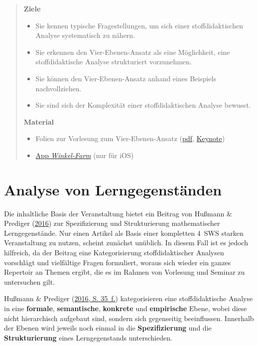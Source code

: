 \documentclass[
]{scrbook}
\providecommand{\tightlist}{%
  \setlength{\itemsep}{0pt}\setlength{\parskip}{0pt}}
\theoremstyle{definition}
\theoremstyle{definition}
\theoremstyle{definition}
\theoremstyle{definition}
\theoremstyle{remark}
\begin{document}
\begin{quote}
\textbf{Ziele}

\begin{itemize}
\tightlist
\item
  Sie kennen typische Fragestellungen, um sich einer stoffdidaktischen Analyse systematisch zu nähern.
\item
  Sie erkennen den Vier-Ebenen-Ansatz als eine Möglichkeit, eine stoffdidaktische Analyse strukturiert vorzunehmen.
\item
  Sie können den Vier-Ebenen-Ansatz anhand eines Beispiels nachvollziehen.
\item
  Sie sind sich der Komplexität einer stoffdidaktischen Analyse bewusst.
\end{itemize}

\textbf{Material}

\begin{itemize}
\tightlist
\item
  Folien zur Vorlesung zum Vier-Ebenen-Ansatz (\href{files/Stoffdidaktik-WiSe2223-Kap1.pdf}{pdf}, \href{files/Stoffdidaktik-WiSe2223-Kap1.key}{Keynote})
\item
  \href{https://apps.apple.com/de/app/winkel-farm/id1369585218}{App \emph{Winkel-Farm}} (nur für iOS)
\end{itemize}
\end{quote}

\hypertarget{analyse-von-lerngegenstuxe4nden}{%
\section{Analyse von Lerngegenständen}\label{analyse-von-lerngegenstuxe4nden}}

Die inhaltliche Basis der Veranstaltung bietet ein Beitrag von Hußmann \& Prediger (\protect\hyperlink{ref-Hussmann:2016}{2016}) zur Spezifizierung und Strukturierung mathematischer Lerngegenstände. Nur einen Artikel als Basis einer kompletten 4~SWS starken Veranstaltung zu nutzen, scheint zunächst unüblich. In diesem Fall ist es jedoch hilfreich, da der Beitrag eine Kategorisierung stoffdidaktischer Analysen vorschlägt und vielfältige Fragen formuliert, woraus sich wieder ein ganzes Repertoir an Themen ergibt, die es im Rahmen von Vorlesung und Seminar zu untersuchen gilt.

Hußmann \& Prediger (\protect\hyperlink{ref-Hussmann:2016}{2016, S. 35~f.}) kategorisieren eine stoffdidaktische Analyse in eine \textbf{\textcolor{formalColor}{formale}}, \textbf{\textcolor{semanticColor}{semantische}}, \textbf{\textcolor{concreteColor}{konkrete}} und \textbf{\textcolor{empiricColor}{empirische}} Ebene, wobei diese nicht hierarchisch aufgebaut sind, sondern sich gegenseitig beeinflussen. Innerhalb der Ebenen wird jeweils noch einmal in die \textbf{Spezifizierung} und die \textbf{Strukturierung} eines Lerngegenstands unterschieden.
\end{document}
